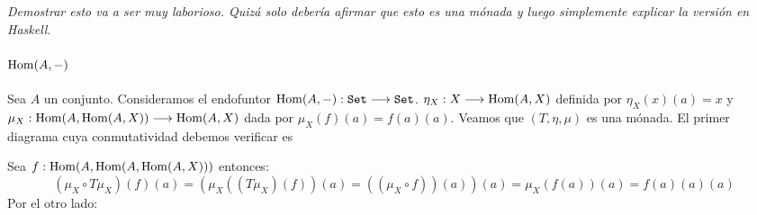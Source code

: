 \textit{Demostrar esto va a ser muy laborioso. Quizá solo debería afirmar que esto es una mónada y luego simplemente explicar la versión en Haskell}.

\paragraph{$\operatorname{Hom}(A, -)$}
Sea $A$ un conjunto. Consideramos el endofuntor $\operatorname{Hom}(A, -) : \texttt{Set}\longrightarrow \texttt{Set}$.
$\eta_X : X\longrightarrow \operatorname{Hom}(A, X)$ definida por $\eta_X(x)(a) = x$ y
$\mu_X : \operatorname{Hom}(A, \operatorname{Hom}(A, X))\longrightarrow \operatorname{Hom}(A, X)$ dada por
$\mu_X(f)(a) = f(a)(a)$. Veamos que $(T, \eta, \mu)$ es una
mónada. El primer diagrama cuya conmutatividad debemos
verificar es
\begin{center}
\end{center}

Sea $f : \operatorname{Hom}(A, \operatorname{Hom}(A, \operatorname{Hom}(A, X)))$ entonces:
$$(\mu_X \circ T\mu_X)(f)(a) = (\mu_X( (T\mu_X)(f) )(a)
   = ((\mu_X \circ f))(a))(a)
   = \mu_X(f(a))(a)
   = f(a)(a)(a)$$
Por el otro lado:
\begin{center}
\end{center}
